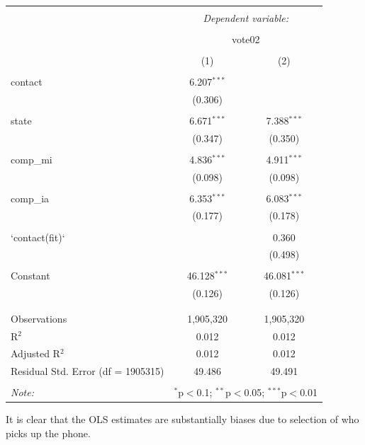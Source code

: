 \documentclass[
]{article}
\begin{document}
\begin{table}[!htbp] \centering 
  \caption{} 
  \label{} 
\begin{tabular}{@{\extracolsep{5pt}}lcc} 
\\[-1.8ex]\hline 
\hline \\[-1.8ex] 
 & \multicolumn{2}{c}{\textit{Dependent variable:}} \\ 
\cline{2-3} 
\\[-1.8ex] & \multicolumn{2}{c}{vote02} \\ 
\\[-1.8ex] & (1) & (2)\\ 
\hline \\[-1.8ex] 
 contact & 6.207$^{***}$ &  \\ 
  & (0.306) &  \\ 
  & & \\ 
 state & 6.671$^{***}$ & 7.388$^{***}$ \\ 
  & (0.347) & (0.350) \\ 
  & & \\ 
 comp\_mi & 4.836$^{***}$ & 4.911$^{***}$ \\ 
  & (0.098) & (0.098) \\ 
  & & \\ 
 comp\_ia & 6.353$^{***}$ & 6.083$^{***}$ \\ 
  & (0.177) & (0.178) \\ 
  & & \\ 
 `contact(fit)` &  & 0.360 \\ 
  &  & (0.498) \\ 
  & & \\ 
 Constant & 46.128$^{***}$ & 46.081$^{***}$ \\ 
  & (0.126) & (0.126) \\ 
  & & \\ 
\hline \\[-1.8ex] 
Observations & 1,905,320 & 1,905,320 \\ 
R$^{2}$ & 0.012 & 0.012 \\ 
Adjusted R$^{2}$ & 0.012 & 0.012 \\ 
Residual Std. Error (df = 1905315) & 49.486 & 49.491 \\ 
\hline 
\hline \\[-1.8ex] 
\textit{Note:}  & \multicolumn{2}{r}{$^{*}$p$<$0.1; $^{**}$p$<$0.05; $^{***}$p$<$0.01} \\ 
\end{tabular} 
\end{table}

It is clear that the OLS estimates are substantially biases due to
selection of who picks up the phone.
\end{document}
